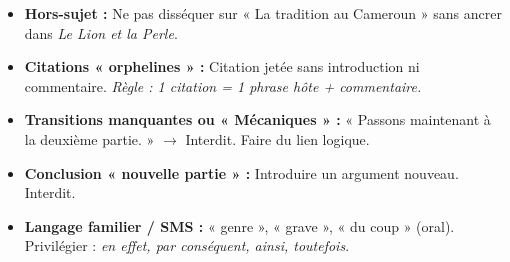 \documentclass[11pt]{article}
\begin{document}
\begin{attention}
\begin{itemize}
    \item \textbf{Hors-sujet :} Ne pas disséquer sur « La tradition au Cameroun » sans ancrer dans \emph{Le Lion et la Perle}.
    \item \textbf{Citations « orphelines » :} Citation jetée sans introduction ni commentaire. \textit{Règle : 1 citation = 1 phrase hôte + commentaire.}
    \item \textbf{Transitions manquantes ou « Mécaniques » :} « Passons maintenant à la deuxième partie. » $\rightarrow$ Interdit. Faire du lien logique.
    \item \textbf{Conclusion « nouvelle partie » :} Introduire un argument nouveau. Interdit.
    \item \textbf{Langage familier / SMS :} « genre », « grave », « du coup » (oral). Privilégier : \emph{en effet, par conséquent, ainsi, toutefois}.
\end{itemize}
\end{attention}
\end{document}
